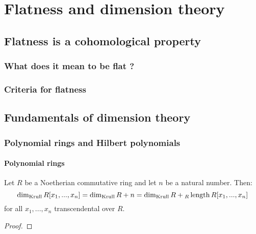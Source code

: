 \chapter{Flatness and dimension theory}
    \begin{abstract}
        
    \end{abstract}
    
    \minitoc
    
    \section{Flatness is a cohomological property}
        \subsection{What does it mean to be flat ?}
        
        \subsection{Criteria for flatness}

    \section{Fundamentals of dimension theory}
        \subsection{Polynomial rings and Hilbert polynomials}
            \subsubsection{Polynomial rings}
                \begin{proposition} \label{prop: dimensions_of_polynomial_rings}
                    Let $R$ be a Noetherian commutative ring and let $n$ be a natural number. Then:
                        $$\dim_{\mathrm{Krull}} R[x_1, ..., x_n] = \dim_{\mathrm{Krull}} R + n = \dim_{\mathrm{Krull}} R + {}_R\operatorname{length} R[x_1, ..., x_n]$$
                    for all $x_1, ..., x_n$ transcendental over $R$.
                \end{proposition}
                    \begin{proof}
                        
                    \end{proof}
                
